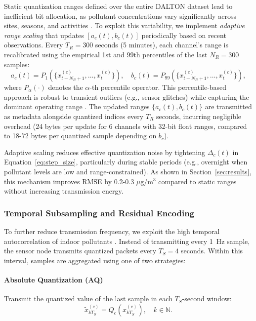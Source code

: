 Static quantization ranges defined over the entire DALTON dataset lead to inefficient bit allocation, as pollutant concentrations vary significantly across sites, seasons, and activities \cite{karmakar2024exploring}. To exploit this variability, we implement \textit{adaptive range scaling} that updates $[a_c(t), b_c(t)]$ periodically based on recent observations. Every $T_R = 300$ seconds (5 minutes), each channel's range is recalibrated using the empirical 1st and 99th percentiles of the last $N_R = 300$ samples:
\begin{equation}
a_c(t) = P_1\left( \{x_{t-N_R+1}^{(c)}, \ldots, x_t^{(c)}\} \right), \quad
b_c(t) = P_{99}\left( \{x_{t-N_R+1}^{(c)}, \ldots, x_t^{(c)}\} \right),
\label{eq:adaptive_range}
\end{equation}
where $P_\alpha(\cdot)$ denotes the $\alpha$-th percentile operator. This percentile-based approach is robust to transient outliers (e.g., sensor glitches) while capturing the dominant operating range \cite{karmakar2024indoor}. The updated ranges $\{a_c(t), b_c(t)\}$ are transmitted as metadata alongside quantized indices every $T_R$ seconds, incurring negligible overhead (24 bytes per update for 6 channels with 32-bit float ranges, compared to 18-72 bytes per quantized sample depending on $b_c$).

Adaptive scaling reduces effective quantization noise by tightening $\Delta_c(t)$ in Equation~\eqref{eq:step_size}, particularly during stable periods (e.g., overnight when pollutant levels are low and range-constrained). As shown in Section~\ref{sec:results}, this mechanism improves RMSE by 0.2-0.3 $\mu$g/m$^3$ compared to static ranges without increasing transmission energy.

\subsubsection{Temporal Subsampling and Residual Encoding}

To further reduce transmission frequency, we exploit the high temporal autocorrelation of indoor pollutants \cite{karmakar2024exploring}. Instead of transmitting every 1~Hz sample, the sensor node transmits quantized packets every $T_S = 4$ seconds. Within this interval, samples are aggregated using one of two strategies:

\paragraph{Absolute Quantization (AQ)}
Transmit the quantized value of the last sample in each $T_S$-second window:
\begin{equation}
\tilde{x}_{kT_S}^{(c)} = Q_c(x_{kT_S}^{(c)}), \quad k \in \mathbb{N}.
\label{eq:absolute_quantization}
\end{equation}

